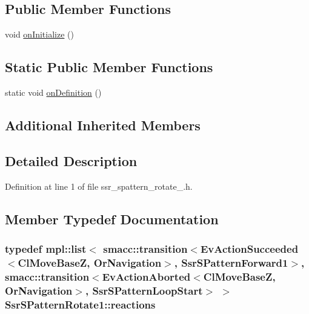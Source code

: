 \subsection*{Public Member Functions}
\begin{DoxyCompactItemize}
\item 
void \hyperlink{structSsrSPatternRotate1_a8e3038ccd3fd6007ea7614ba703b7948}{on\+Initialize} ()
\end{DoxyCompactItemize}
\subsection*{Static Public Member Functions}
\begin{DoxyCompactItemize}
\item 
static void \hyperlink{structSsrSPatternRotate1_aa1ceb73aab8fe995f57e02b9edec44a8}{on\+Definition} ()
\end{DoxyCompactItemize}
\subsection*{Additional Inherited Members}


\subsection{Detailed Description}


Definition at line 1 of file ssr\+\_\+spattern\+\_\+rotate\+\_.\+h.



\subsection{Member Typedef Documentation}
\subsubsection[{\texorpdfstring{reactions}{reactions}}]{\setlength{\rightskip}{0pt plus 5cm}typedef mpl\+::list$<$ {\bf smacc\+::transition}$<$Ev\+Action\+Succeeded$<$Cl\+Move\+BaseZ, Or\+Navigation$>$, {\bf Ssr\+S\+Pattern\+Forward1}$>$, {\bf smacc\+::transition}$<$Ev\+Action\+Aborted$<$Cl\+Move\+BaseZ, Or\+Navigation$>$, {\bf Ssr\+S\+Pattern\+Loop\+Start}$>$ $>$ {\bf Ssr\+S\+Pattern\+Rotate1\+::reactions}}\hypertarget{structSsrSPatternRotate1_ab760ca2d3f45079aa96171c6436654cb}{}\label{structSsrSPatternRotate1_ab760ca2d3f45079aa96171c6436654cb}


